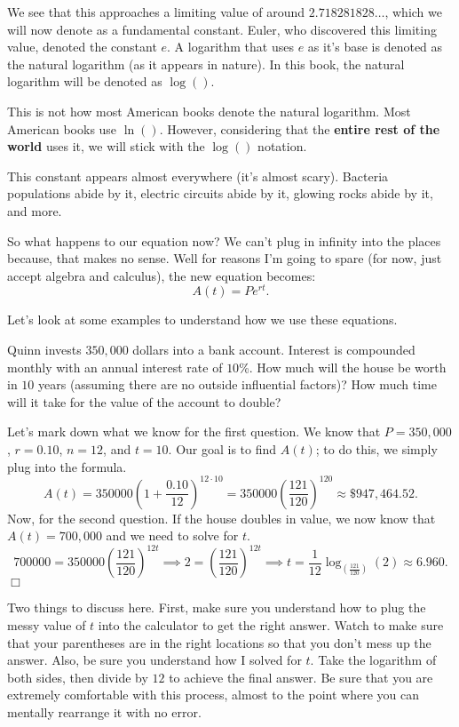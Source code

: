 \documentclass[../book.tex]{subfiles}
\begin{document}
We see that this approaches a limiting value of around $2.718281828\ldots$, which we will now denote as a fundamental constant.  Euler, who discovered this limiting value, denoted the constant $e$.  A logarithm that uses $e$ as it's base is denoted as the natural logarithm (as it appears in nature).  In this book, the natural logarithm will be denoted as $\log()$.

\begin{remark}
This is not how most American books denote the natural logarithm.  Most American books use $\ln()$.  However, considering that the \textbf{entire rest of the world} uses it, we will stick with the $\log()$ notation.
\end{remark}

This constant appears almost everywhere (it's almost scary).  Bacteria populations abide by it, electric circuits abide by it, glowing rocks abide by it, and more.

So what happens to our equation now?  We can't plug in infinity into the places because, that makes no sense. Well for reasons I'm going to spare (for now, just accept algebra and calculus), the new equation becomes: $$A(t)=Pe^{rt}.$$

Let's look at some examples to understand how we use these equations.
\begin{example}
Quinn invests $350,000$ dollars into a bank account. Interest is compounded monthly with an annual interest rate of $10$\%. How much will the house be worth in $10$ years (assuming there are no outside influential factors)?  How much time will it take for the value of the account to double?
\end{example}
\begin{solution}
Let's mark down what we know for the first question.  We know that $P=350,000$, $r=0.10$, $n=12$, and $t=10$.  Our goal is to find $A(t)$; to do this, we simply plug into the formula.
$$A(t)=350000\left(1+\dfrac{0.10}{12}\right)^{12\cdot 10}=350000\left(\dfrac{121}{120}\right)^{120}\approx \$947,464.52.$$  Now, for the second question.  If the house doubles in value, we now know that $A(t)=700,000$ and we need to solve for $t$.  $$700000=350000\left(\dfrac{121}{120}\right)^{12t} \implies 2=\left(\dfrac{121}{120}\right)^{12t}\implies t=\dfrac{1}{12}\log_{\left(\frac{121}{120}\right)}(2) \approx 6.960.$$ $\Box$
\end{solution}
\begin{remark}
Two things to discuss here.  First, make sure you understand how to plug the messy value of $t$ into the calculator to get the right answer.  Watch to make sure that your parentheses are in the right locations so that you don't mess up the answer.  Also, be sure you understand how I solved for $t$.  Take the logarithm of both sides, then divide by $12$ to achieve the final answer.  Be sure that you are extremely comfortable with this process, almost to the point where you can mentally rearrange it with no error.
\end{remark}
\end{document}
